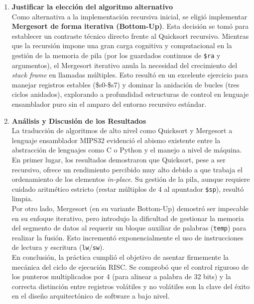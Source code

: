 \documentclass[12pt,letterpaper]{article}
\begin{document}
\begin{enumerate}[label=\textbf{\arabic*.}, leftmargin=*]
    \item \textbf{Justificar la elección del algoritmo alternativo} \\
    Como alternativa a la implementación recursiva inicial, se eligió implementar \textbf{Mergesort de forma iterativa (Bottom-Up)}. Esta decisión se tomó para establecer un contraste técnico directo frente al Quicksort recursivo. Mientras que la recursión impone una gran carga cognitiva y computacional en la gestión de la memoria de pila (por los guardados continuos de \texttt{\$ra} y argumentos), el Mergesort iterativo anula la necesidad del crecimiento del \textit{stack frame} en llamadas múltiples. Esto resultó en un excelente ejercicio para manejar registros estables (\$s0-\$s7) y dominar la anidación de bucles (tres ciclos anidados), explorando a profundidad estructuras de control en lenguaje ensamblador puro sin el amparo del entorno recursivo estándar.

    \item \textbf{Análisis y Discusión de los Resultados} \\
    La traducción de algoritmos de alto nivel como Quicksort y Mergesort a lenguaje ensamblador MIPS32 evidenció el abismo existente entre la abstracción de lenguajes como C o Python y el manejo a nivel de máquina. \\
    En primer lugar, los resultados demostraron que Quicksort, pese a ser recursivo, ofrece un rendimiento percibido muy alto debido a que trabaja el ordenamiento de los elementos \textit{in-place}. Su gestión de la pila, aunque requiere cuidado aritmético estricto (restar múltiplos de 4 al apuntador \texttt{\$sp}), resultó limpia.\\
    Por otro lado, Mergesort (en su variante Bottom-Up) demostró ser impecable en su enfoque iterativo, pero introdujo la dificultad de gestionar la memoria del segmento de datos al requerir un bloque auxiliar de palabras (\texttt{temp}) para realizar la fusión. Esto incrementó exponencialmente el uso de instrucciones de lectura y escritura (\texttt{lw}/\texttt{sw}). \\
    En conclusión, la práctica cumplió el objetivo de asentar firmemente la mecánica del ciclo de ejecución RISC. Se comprobó que el control riguroso de los punteros multiplicados por 4 (para alinear a palabra de 32 bits) y la correcta distinción entre registros volátiles y no volátiles son la clave del éxito en el diseño arquitectónico de software a bajo nivel.
\end{enumerate}
\end{document}
